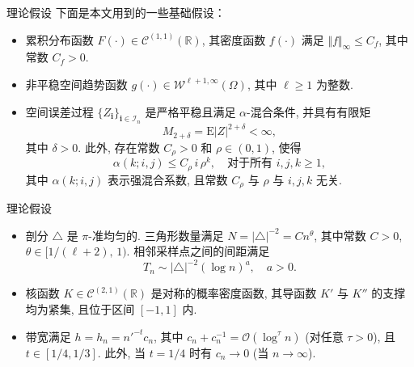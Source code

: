 \documentclass{beamer}
\begin{document}
\begin{frame}{理论假设}
下面是本文用到的一些基础假设：

\begin{itemize}
\item[(A1)] 累积分布函数 $F(\cdot) \in \mathcal{C}^{(1,1)}(\mathbb{R})$, 其密度函数 $f(\cdot)$ 满足 $\Vert f \Vert_{\infty} \leq C_f$, 其中常数 $C_f > 0$.

\item[(A2)] 非平稳空间趋势函数 $g(\cdot) \in \mathcal{W}^{\ell+1, \infty}(\Omega)$, 其中 $\ell \geq 1$ 为整数.

\item[(A3)] 空间误差过程 $\{ Z_{\mathbf{i}} \}_{\mathbf{i} \in \mathcal{I}_n}$ 是严格平稳且满足 $\alpha$-混合条件, 并具有有限矩
\[
M_{2+\delta} = \mathrm{E}|Z|^{2+\delta} < \infty,
\]
其中 $\delta > 0$. 此外, 存在常数 $C_\rho > 0$ 和 $\rho \in (0,1)$, 使得
\[
\alpha(k; i, j) \leq C_\rho\, i\, \rho^k, \quad \text{对于所有 } i, j, k \geq 1,
\]
其中 $\alpha(k; i, j)$ 表示强混合系数, 且常数 $C_\rho$ 与 $\rho$ 与 $i, j, k$ 无关.
\end{itemize}
\end{frame}

\begin{frame}{理论假设}
\begin{itemize}
\item[(A4)] 剖分 $\triangle$ 是 $\pi$-准均匀的. 三角形数量满足 $N = |\triangle|^{-2} = C n^\theta$, 其中常数 $C > 0$, $\theta \in [1/(\ell+2),\,1)$. 相邻采样点之间的间距满足
\[
T_n \sim |\triangle|^{-2} (\log n)^a, \quad a > 0.
\]
\label{Assumption:Delta}

\item[(A5)] 核函数 $K \in \mathcal{C}^{(2,1)}(\mathbb{R})$ 是对称的概率密度函数, 其导函数 $K'$ 与 $K''$ 的支撑均为紧集, 且位于区间 $[-1,1]$ 内.

\item[(A6)] 带宽满足 $h = h_n = n'^{-t} c_n$, 其中 $c_n + c_n^{-1} = {\scriptstyle{\mathcal{O}}}(\log^\tau n)$ (对任意 $\tau > 0$), 且 $t \in [1/4, 1/3]$. 此外, 当 $t = 1/4$ 时有 $c_n \to 0$ (当 $n \to \infty$).
\end{itemize}
\end{frame}
\end{document}
